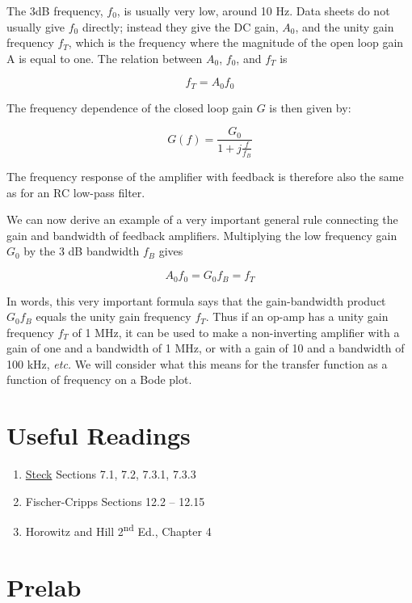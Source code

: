 \documentclass[10pt]{PhysLab1C} %
\begin{document}
The 3dB frequency, \(f_0\), is usually very low, around 10 Hz. Data
sheets do not usually give \(f_0\) directly; instead they give the DC
gain, \(A_0\), and the unity gain frequency \(f_T\), which is the
frequency where the magnitude of the open loop gain A is equal to one.
The relation between \(A_0\), \(f_0\), and \(f_T\) is

\[f_{T} = A_{0}f_{0}\]

The frequency dependence of the closed loop gain $G$ is then given by:

\[G(f)=\frac{G_0}{1+j\frac{f}{f_B}}\]

The frequency response of the amplifier with feedback is therefore also
the same as for an RC low-pass filter.

We can now derive an example of a very important general rule connecting
the gain and bandwidth of feedback amplifiers. Multiplying the low
frequency gain \(G_0\) by the 3 dB bandwidth \(f_B\) gives

\[A_0 f_0=G_0 f_B = f_T\]

In words, this very important formula says that the gain-bandwidth
product \(G_0f_B\) equals the unity gain frequency \(f_T\). Thus if an
op-amp has a unity gain frequency \(f_T\) of 1 MHz, it can be used to
make a non-inverting amplifier with a gain of one and a bandwidth of 1
MHz, or with a gain of 10 and a bandwidth of 100 kHz, \emph{etc.} We
will consider what this means for the transfer function as a function of
frequency on a Bode plot.


\section{Useful Readings}


\begin{enumerate}
\item
  \href{https://atomoptics-nas.uoregon.edu/~dsteck/teaching/electronics/electronics-notes.pdf}{Steck} Sections 7.1, 7.2, 7.3.1, 7.3.3
  
\item
  Fischer-Cripps Sections 12.2 -- 12.15
\item
  Horowitz and Hill 2\textsuperscript{nd} Ed., Chapter 4
\end{enumerate}


\section{Prelab}
\end{document}
